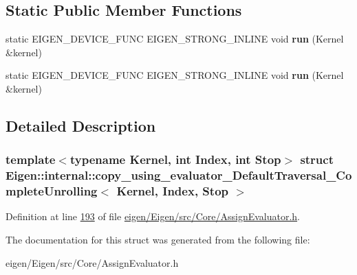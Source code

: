\subsection*{Static Public Member Functions}
\begin{DoxyCompactItemize}
\item 
\mbox{\label{struct_eigen_1_1internal_1_1copy__using__evaluator___default_traversal___complete_unrolling_a9d9964d1daebdb781f198dc25cde8d1f}} 
static E\+I\+G\+E\+N\+\_\+\+D\+E\+V\+I\+C\+E\+\_\+\+F\+U\+NC E\+I\+G\+E\+N\+\_\+\+S\+T\+R\+O\+N\+G\+\_\+\+I\+N\+L\+I\+NE void {\bfseries run} (Kernel \&kernel)
\item 
\mbox{\label{struct_eigen_1_1internal_1_1copy__using__evaluator___default_traversal___complete_unrolling_a9d9964d1daebdb781f198dc25cde8d1f}} 
static E\+I\+G\+E\+N\+\_\+\+D\+E\+V\+I\+C\+E\+\_\+\+F\+U\+NC E\+I\+G\+E\+N\+\_\+\+S\+T\+R\+O\+N\+G\+\_\+\+I\+N\+L\+I\+NE void {\bfseries run} (Kernel \&kernel)
\end{DoxyCompactItemize}


\subsection{Detailed Description}
\subsubsection*{template$<$typename Kernel, int Index, int Stop$>$\newline
struct Eigen\+::internal\+::copy\+\_\+using\+\_\+evaluator\+\_\+\+Default\+Traversal\+\_\+\+Complete\+Unrolling$<$ Kernel, Index, Stop $>$}



Definition at line \hyperlink{eigen_2_eigen_2src_2_core_2_assign_evaluator_8h_source_l00193}{193} of file \hyperlink{eigen_2_eigen_2src_2_core_2_assign_evaluator_8h_source}{eigen/\+Eigen/src/\+Core/\+Assign\+Evaluator.\+h}.



The documentation for this struct was generated from the following file\+:\begin{DoxyCompactItemize}
\item 
eigen/\+Eigen/src/\+Core/\+Assign\+Evaluator.\+h\end{DoxyCompactItemize}
